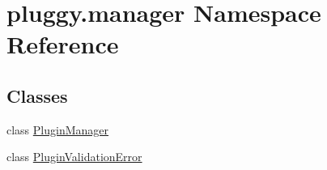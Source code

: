 \hypertarget{namespacepluggy_1_1manager}{}\section{pluggy.\+manager Namespace Reference}
\label{namespacepluggy_1_1manager}
\subsection*{Classes}
\begin{DoxyCompactItemize}
\item 
class \hyperlink{classpluggy_1_1manager_1_1_plugin_manager}{Plugin\+Manager}
\item 
class \hyperlink{classpluggy_1_1manager_1_1_plugin_validation_error}{Plugin\+Validation\+Error}
\end{DoxyCompactItemize}
